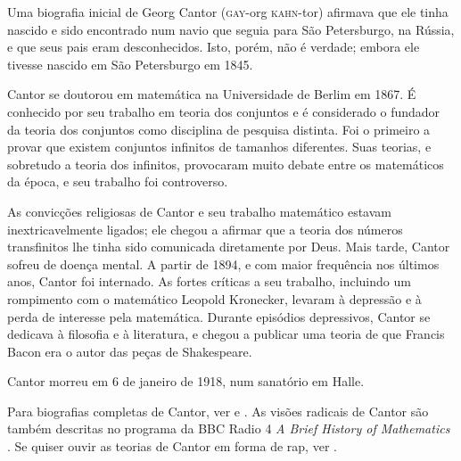 \documentclass[../../../include/open-logic-section]{subfiles}
\begin{document}



Uma biografia inicial de Georg Cantor (\textsc{gay}-org
\textsc{kahn}-tor) afirmava que ele tinha nascido e sido encontrado
num navio que seguia para São Petersburgo, na Rússia, e que seus
pais eram desconhecidos. Isto, porém, não é verdade; embora ele
tivesse nascido em São Petersburgo em 1845.

Cantor se doutorou em matemática na Universidade de Berlim em
1867. É conhecido por seu trabalho em teoria dos conjuntos e é
considerado o fundador da teoria dos conjuntos como disciplina de
pesquisa distinta.
Foi o primeiro a provar que existem conjuntos infinitos de tamanhos
diferentes. Suas teorias, e sobretudo a teoria dos infinitos,
provocaram muito debate entre os matemáticos da época, e seu
trabalho foi controverso.

As convicções religiosas de Cantor e seu trabalho matemático
estavam inextricavelmente ligados; ele chegou a afirmar que a teoria
dos números transfinitos lhe tinha sido comunicada diretamente por
Deus. Mais tarde, Cantor sofreu de doença mental. A partir de 1894, e
com maior frequência nos últimos anos, Cantor foi internado. As fortes
críticas a seu trabalho, incluindo um rompimento com o matemático
Leopold Kronecker, levaram à depressão e à perda de interesse pela
matemática. Durante episódios depressivos, Cantor se dedicava à
filosofia e à literatura, e chegou a publicar uma teoria de que
Francis Bacon era o autor das peças de Shakespeare.

Cantor morreu em 6 de janeiro de 1918, num sanatório em Halle.

\begin{reading} 
Para biografias completas de Cantor, ver \citet{Dauben1990} e
\citet{Grattan-Guinness1971}.  As visões radicais de Cantor são
também descritas no programa da BBC Radio 4 \emph{A Brief History of
  Mathematics} \citep{Sautoy2014}.  Se quiser ouvir as teorias de
Cantor em forma de rap, ver \citet{Rose2012}.
\end{reading}
\end{document}
